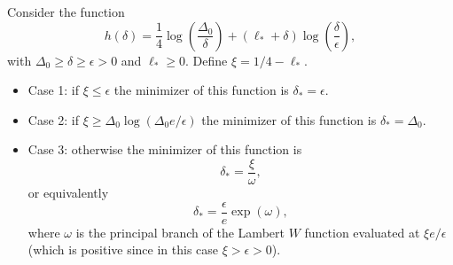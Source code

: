 \documentclass[10pt]{article} %
\begin{document}
\begin{lemma}
\label{lem:lambert}
Consider the function
\begin{equation}
\label{eq:lambertW}
h(\delta) =
    \frac{1}{4}\log\left(\frac{\Delta_{0}}{\delta}\right) + (\ell_* + \delta)\log\left(\frac{\delta}{\epsilon}\right),
\end{equation}
    with $\Delta_0 \geq \delta \geq \epsilon > 0$ and $\ell_* \geq 0$.
    Define $\xi = 1/4 - \ell_*$. 
    \begin{itemize}
        \item Case 1: if $\xi \leq \epsilon$ the minimizer of this function is $\delta_*=\epsilon$.
        \item Case 2: if $\xi \geq \Delta_0\log(\Delta_0e/\epsilon)$ the minimizer of this function is $\delta_* = \Delta_0$.
        \item Case 3: otherwise the minimizer of this function is 
        \begin{equation}
        \delta_* = \frac{\xi}{\omega},
    \end{equation}
    or equivalently
    \begin{equation}
        \delta_* = \frac{\epsilon}{e}\exp(\omega),
    \end{equation}
        where $\omega$ is the principal branch of the Lambert $W$ function evaluated at $\xi e/\epsilon$ (which is positive since in this case $\xi > \epsilon > 0$).
    \end{itemize}
\end{lemma}
\end{document}
